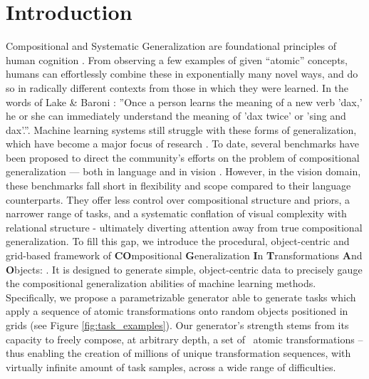 \section{Introduction}


Compositional and Systematic Generalization  are foundational principles of human cognition \cite{fodor1988connectionism}. From observing a few examples of given ``atomic'' concepts, humans can effortlessly combine these in exponentially many novel ways, and do so in radically different contexts from those in which they were learned. In the words of Lake \& Baroni \cite{SCAN_lake_baroni}: ''Once a person learns the meaning of a new verb 'dax,' he or she can immediately understand the meaning of 'dax twice' or 'sing and dax'.''.
%
Machine learning systems still struggle with these forms of generalization, which have become a major focus of research \cite{galke2024deep, besold2016generality, wiedemer2023compositional, lake_baroni_2023, keysers2019measuring, xu2022compositional}. 
%
To date, several benchmarks have been proposed to direct the community's efforts on the problem of compositional generalization — both in language \cite{SCAN_lake_baroni, schug2023discovering, keysers2019measuring} and in vision \cite{clevr, cvr2022, barrett2018measuring, fleuret2011comparing}. However, in the vision domain, these benchmarks fall short in flexibility and scope compared to their language counterparts. They offer less control over compositional structure and priors, a narrower range of tasks, and a systematic conflation of visual complexity with relational structure - ultimately diverting attention away from true compositional generalization. 
%
To fill this gap, we introduce the procedural, object-centric and grid-based framework of \textbf{CO}mpositional \textbf{G}eneralization \textbf{I}n \textbf{T}ransformations \textbf{A}nd \textbf{O}bjects: \textbf{\generatorName}.  It is designed to generate simple, object-centric data to precisely gauge the compositional generalization abilities of machine learning methods. Specifically, we propose a parametrizable generator able to generate tasks which apply a sequence of atomic transformations onto random objects positioned in grids (see Figure \ref{fig:task_examples}). Our generator's strength stems from its capacity to freely compose, at arbitrary depth, a set of \ntransforms\ atomic transformations -- thus enabling the creation of millions of unique transformation sequences, with virtually infinite amount of task samples, across a wide range of difficulties. 

